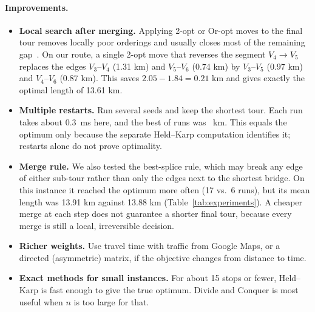 \paragraph{Improvements.}
\begin{itemize}
  \item \textbf{Local search after merging.} Applying 2-opt or Or-opt moves to
        the final tour removes locally poor orderings and usually closes most of
        the remaining gap~\cite{applegate2006tsp}. On our route, a single 2-opt
        move that reverses the segment $V_4 \to V_5$ replaces the edges
        $V_3$--$V_4$ (1.31 km) and $V_5$--$V_6$ (0.74 km) by $V_3$--$V_5$
        (0.97 km) and $V_4$--$V_6$ (0.87 km). This saves $2.05 - 1.84 = 0.21$
        km and gives exactly the optimal length of 13.61 km.
  \item \textbf{Multiple restarts.} Run several seeds and keep the shortest tour. Each run takes about
        0.3~ms here, and the best of \RunCount{} runs was \BridgeBest{}~km. This equals the optimum
        only because the separate Held--Karp computation identifies it; restarts alone do not prove
        optimality.
  \item \textbf{Merge rule.} We also tested the best-splice rule, which may
        break any edge of either sub-tour rather than only the edges next to the
        shortest bridge. On this instance it reached the optimum more often (17 vs.\
        6 runs), but its mean length was 13.91 km against 13.88 km
        (Table~\ref{tab:experiments}). A cheaper merge at each step does not
        guarantee a shorter final tour, because every merge is still a local,
        irreversible decision.
  \item \textbf{Richer weights.} Use travel time with traffic from Google Maps, or a directed (asymmetric)
        matrix, if the objective changes from distance to time.
  \item \textbf{Exact methods for small instances.} For about 15 stops or fewer, Held--Karp is fast
        enough to give the true optimum. Divide and Conquer is most useful when $n$ is too large for that.
\end{itemize}

